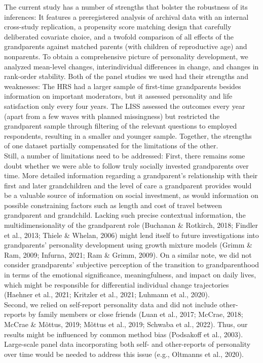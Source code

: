 \documentclass[
  english,
  man,floatsintext]{apa7}
\begin{document}
The current study has a number of strengths that bolster the robustness of its inferences: It features a preregistered analysis of archival data with an internal cross-study replication, a propensity score matching design that carefully deliberated covariate choice, and a twofold comparison of all effects of the grandparents against matched parents (with children of reproductive age) and nonparents. To obtain a comprehensive picture of personality development, we analyzed mean-level changes, interindividual differences in change, and changes in rank-order stability. Both of the panel studies we used had their strengths and weaknesses: The HRS had a larger sample of first-time grandparents besides information on important moderators, but it assessed personality and life satisfaction only every four years. The LISS assessed the outcomes every year (apart from a few waves with planned missingness) but restricted the grandparent sample through filtering of the relevant questions to employed respondents, resulting in a smaller and younger sample. Together, the strengths of one dataset partially compensated for the limitations of the other.\\
Still, a number of limitations need to be addressed: First, there remains some doubt whether we were able to follow truly socially invested grandparents over time. More detailed information regarding a grandparent's relationship with their first and later grandchildren and the level of care a grandparent provides would be a valuable source of information on social investment, as would information on possible constraining factors such as length and cost of travel between grandparent and grandchild. Lacking such precise contextual information, the multidimensionality of the grandparent role (Buchanan \& Rotkirch, 2018; Findler et al., 2013; Thiele \& Whelan, 2006) might lend itself to future investigations into grandparents' personality development using growth mixture models (Grimm \& Ram, 2009; Infurna, 2021; Ram \& Grimm, 2009). On a similar note, we did not consider grandparents' subjective perception of the transition to grandparenthood in terms of the emotional significance, meaningfulness, and impact on daily lives, which might be responsible for differential individual change trajectories (Haehner et al., 2021; Kritzler et al., 2021; Luhmann et al., 2020).\\
Second, we relied on self-report personality data and did not include other-reports by family members or close friends (Luan et al., 2017; McCrae, 2018; McCrae \& Mõttus, 2019; Mõttus et al., 2019; Schwaba et al., 2022). Thus, our results might be influenced by common method bias (Podsakoff et al., 2003). Large-scale panel data incorporating both self- and other-reports of personality over time would be needed to address this issue (e.g., Oltmanns et al., 2020).\\
\end{document}
